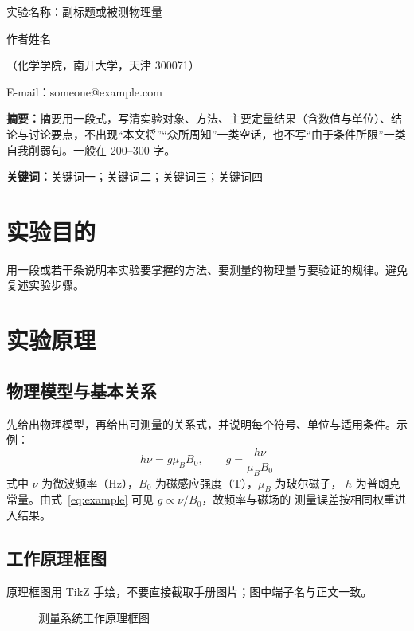 \documentclass[UTF8,zihao=5,a4paper]{ctexart}
\begin{document}
\begin{center}
  {\heiti 实验名称：副标题或被测物理量}\par
  \vspace{0.8em}
  { 作者姓名}\par
  \vspace{0.35em}
  {（化学学院，南开大学，天津 300071）}\par
  \vspace{0.35em}
  { E-mail：someone@example.com}
\end{center}

\vspace{0.6em}

\noindent\textbf{摘要：}摘要用一段式，写清实验对象、方法、主要定量结果（含数值与单位）、结论与讨论要点，不出现“本文将”“众所周知”一类空话，也不写“由于条件所限”一类自我削弱句。一般在 200--300 字。\par
\noindent\textbf{关键词：}关键词一；关键词二；关键词三；关键词四

\section{实验目的}
用一段或若干条说明本实验要掌握的方法、要测量的物理量与要验证的规律。避免复述实验步骤。

\section{实验原理}
\subsection{物理模型与基本关系}
先给出物理模型，再给出可测量的关系式，并说明每个符号、单位与适用条件。示例：
\begin{equation}
h\nu = g\mu_B B_0,
\qquad
g=\frac{h\nu}{\mu_B B_0}
\label{eq:example}
\end{equation}
式中 $\nu$ 为微波频率（Hz），$B_0$ 为磁感应强度（T），$\mu_B$ 为玻尔磁子，
$h$ 为普朗克常量。由式~\eqref{eq:example} 可见 $g\propto\nu/B_0$，故频率与磁场的
测量误差按相同权重进入结果。

\subsection{工作原理框图}
原理框图用 TikZ 手绘，不要直接截取手册图片；图中端子名与正文一致。
\begin{figure}[htbp]
\centering
{}
\caption{测量系统工作原理框图}
\label{fig:block}
\end{figure}
\end{document}
